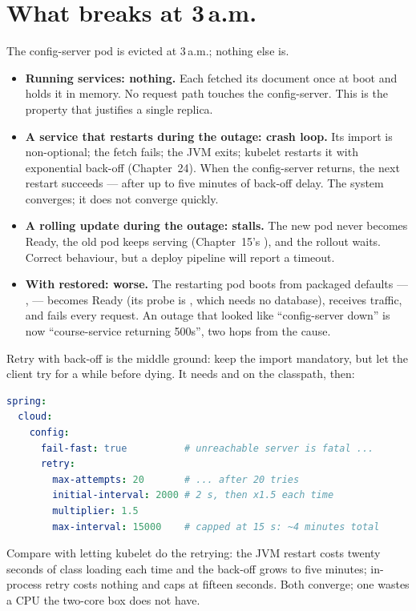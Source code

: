 \section{What breaks at 3\,a.m.}

The config-server pod is evicted at 3\,a.m.; nothing else is.

\begin{itemize}
  \item \textbf{Running services: nothing.} Each fetched its document
  once at boot and holds it in memory. No request path touches the
  config-server. This is the property that justifies a single replica.
  \item \textbf{A service that restarts during the outage: crash loop.}
  Its import is non-optional; the fetch fails; the JVM exits; kubelet
  restarts it with exponential back-off (Chapter~24). When the
  config-server returns, the next restart succeeds --- after up to five
  minutes of back-off delay. The system converges; it does not
  converge quickly.
  \item \textbf{A rolling update during the outage: stalls.} The new
  pod never becomes Ready, the old pod keeps serving (Chapter~15's
  ), and the rollout waits. Correct behaviour, but
  a deploy pipeline will report a timeout.
  \item \textbf{With  restored: worse.} The restarting
  pod boots from packaged defaults --- ,
   --- becomes Ready (its probe is
  , which needs no database), receives traffic, and
  fails every request. An outage that looked like ``config-server down''
  is now ``course-service returning 500s'', two hops from the cause.
\end{itemize}

Retry with back-off is the middle ground: keep the import mandatory,
but let the client try for a while before dying. It needs
 and  on the classpath,
then:

\begin{lstlisting}[language=yaml]
spring:
  cloud:
    config:
      fail-fast: true          # unreachable server is fatal ...
      retry:
        max-attempts: 20       # ... after 20 tries
        initial-interval: 2000 # 2 s, then x1.5 each time
        multiplier: 1.5
        max-interval: 15000    # capped at 15 s: ~4 minutes total
\end{lstlisting}

Compare with letting kubelet do the retrying: the JVM restart costs
twenty seconds of class loading each time and the back-off grows to
five minutes; in-process retry costs nothing and caps at fifteen
seconds. Both converge; one wastes a CPU the two-core box does not have.

